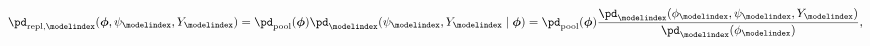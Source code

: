 \begin{equation}
  \pd_{\text{repl}, \modelindex}(\boldsymbol{\phi}, \psi_{\modelindex}, Y_{\modelindex}) 
  = 
    \pd_{\text{pool}}(\boldsymbol{\phi})
    \pd_{\modelindex}(\psi_{\modelindex}, Y_{\modelindex} \mid \boldsymbol{\phi})
  = 
    \pd_{\text{pool}}(\boldsymbol{\phi})
    \frac{
      \pd_{\modelindex}(\phi_{\modelindex}, \psi_{\modelindex}, Y_{\modelindex})
    } {
      \pd_{\modelindex}(\phi_{\modelindex})
    },
    \label{eqn:chained-marginal-replacement}
\end{equation}